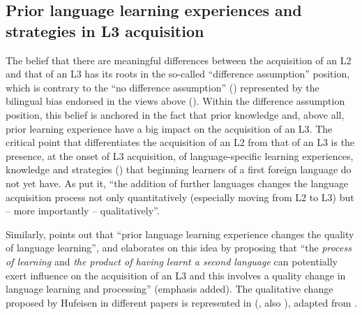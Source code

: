\documentclass[output=paper]{../langscibook}
\begin{document}
\subsection{Prior language learning experiences and strategies in L3 acquisition}\label{sec:sanchez1:1.1}

The belief that there are meaningful differences between the acquisition of an L2 and that of an L3 has its roots in the so-called “difference assumption” position, which is contrary to the “no difference assumption” (\citealt{DeAngelis2007}) represented by the bilingual bias endorsed in the views above (\citealt{SharwoodSmith1994, MitchellMyles1998, Grosjean2010}). Within the difference assumption position, this belief is anchored in the fact that prior knowledge and, above all, prior learning experience have a big impact on the acquisition of an L3. The critical point that differentiates the acquisition of an L2 from that of an L3 is the presence, at the onset of L3 acquisition, of language-specific learning experiences, knowledge and strategies (\citealt{GibsonHufeisen2003}) that beginning learners of a first foreign language do not yet have. As \citet[145]{MarxHufeisen2004} put it, “the addition of further languages changes the language acquisition process not only quantitatively (especially moving from L2 to L3) but – more importantly – qualitatively”.

Similarly, \citet[207]{Jessner1999} points out that “prior language learning experience changes the quality of language learning”, and \citet[14]{Jessner2006} elaborates on this idea by proposing that “the \textit{process of learning} and \textit{the product of having learnt a second language} can potentially exert influence on the acquisition of an L3 and this involves a quality change in language learning and processing” (emphasis added). The qualitative change proposed by Hufeisen in different papers is represented in  (\citealt{Hufeisen1998}, also \citealt[145]{MarxHufeisen2004}), adapted from \citet[314]{HufeisenMarx2007}.


\end{document}
